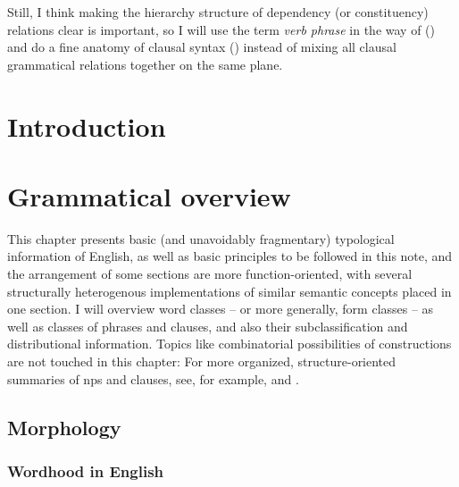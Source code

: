 \documentclass[UTF8, a4paper, oneside, scheme=plain]{ctexrep}
\newcommand*{\term}[1]{\emph{#1}}
\begin{document}
Still, I think making the hierarchy structure of dependency (or constituency) relations clear 
is important,
so I will use the term \term{verb phrase} in the way of \citet{cgel} ()
and do a fine anatomy of clausal syntax ()
instead of mixing all clausal grammatical relations together on the same plane.

\chapter{Introduction}

\setcounter{page}{1}

\chapter{Grammatical overview}

This chapter presents basic (and unavoidably fragmentary) typological information of English,
as well as basic principles to be followed in this note,
and the arrangement of some sections are more function-oriented, 
with several structurally heterogenous implementations of 
similar semantic concepts placed in one section.
I will overview word classes -- or more generally, form classes -- 
as well as classes of phrases and clauses,
and also their subclassification and distributional information.
Topics like combinatorial possibilities of constructions
are not touched in this chapter:
For more organized, structure-oriented summaries of 
\acs{np}s and clauses, 
see, for example,  and .


\section{Morphology}

\subsection{Wordhood in English}
\end{document}

